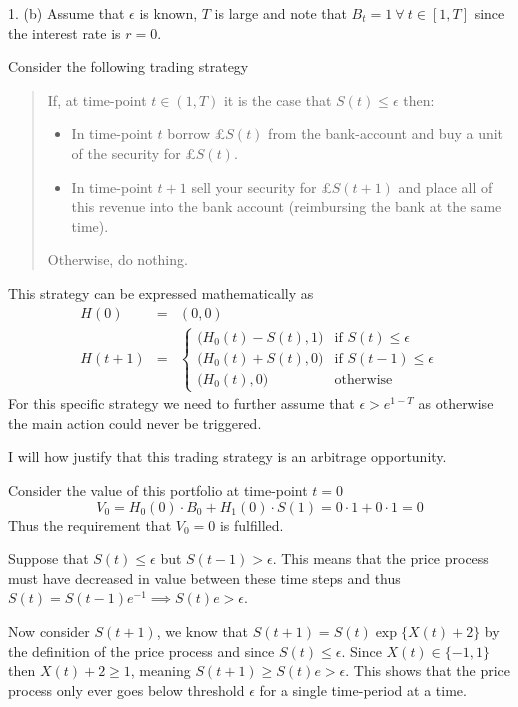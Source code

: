 \documentclass[11pt,a4paper]{article}
\begin{document}
\begin{answer}{1. (b)}
  Assume that $\epsilon$ is known, $T$ is large and note that $B_t=1\ \forall\ t\in[1,T]$ since the interest rate is $r=0$.
  \par Consider the following trading strategy
  \begin{quote}
    If, at time-point $t\in(1,T)$ it is the case that $S(t)\leq\epsilon$ then:
    \begin{itemize}
      \item In time-point $t$ borrow £$S(t)$ from the bank-account and buy a unit of the security for £$S(t)$.
      \item In time-point $t+1$ sell your security for £$S(t+1)$ and place all of this revenue into the bank account (reimbursing the bank at the same time).
    \end{itemize}
    Otherwise, do nothing.
  \end{quote}
  This strategy can be expressed mathematically as
  \[\begin{array}{rcl}
    H(0)&=&(0,0)\\
    H(t+1)&=&\begin{cases}
      \big(H_0(t)-S(t),1\big)&\text{if }S(t)\leq\epsilon\\
      \big(H_0(t)+S(t),0\big)&\text{if }S(t-1)\leq\epsilon\\
      \big(H_0(t),0\big)&\text{otherwise}
  \end{cases}
  \end{array}\]
  For this specific strategy we need to further assume that $\epsilon>e^{1-T}$ as otherwise the main action could never be triggered.

  \par I will how justify that this trading strategy is an arbitrage opportunity.

  \par Consider the value of this portfolio at time-point $t=0$
  \[ V_0=H_0(0)\cdot B_0+H_1(0)\cdot S(1)=0\cdot1+0\cdot1=0 \]
  Thus the requirement that $V_0=0$ is fulfilled.

  \par Suppose that $S(t)\leq\epsilon$ but $S(t-1)>\epsilon$. This means that the price process must have decreased in value between these time steps and thus $S(t)=S(t-1)e^{-1}\implies S(t)e>\epsilon$.
  \par Now consider $S(t+1)$, we know that $S(t+1)=S(t)\exp\{X(t)+2\}$ by the definition of the price process and since $S(t)\leq\epsilon$. Since $X(t)\in\{-1,1\}$ then $X(t)+2\geq1$, meaning $S(t+1)\geq S(t)e>\epsilon$. This shows that the price process only ever goes below threshold $\epsilon$ for a single time-period at a time.


\end{answer}
\end{document}
